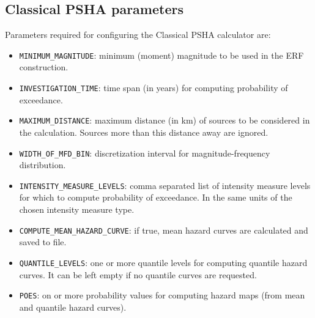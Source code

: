 \subsection{Classical PSHA parameters}
Parameters required for configuring the Classical PSHA calculator are:
\begin{itemize}
\item \Verb+MINIMUM_MAGNITUDE+: minimum (moment) magnitude to be used in the ERF construction.
\item \Verb+INVESTIGATION_TIME+: time span (in years) for computing probability of exceedance.
\item \Verb+MAXIMUM_DISTANCE+: maximum distance (in km) of sources to be considered in the calculation. Sources more than this distance away are ignored.
\item \Verb+WIDTH_OF_MFD_BIN+: discretization interval for  magnitude-frequency distribution.
\item \Verb+INTENSITY_MEASURE_LEVELS+: comma separated list of intensity measure levels for which to compute probability of exceedance. In the same units of the chosen intensity measure type.
\item \Verb+COMPUTE_MEAN_HAZARD_CURVE+: if true, mean hazard curves are calculated and saved to file.
\item \Verb+QUANTILE_LEVELS+: one or more quantile levels for computing quantile hazard curves. It can be left empty if no quantile curves are requested.
\item \Verb+POES+: on or more probability values for computing hazard maps (from mean and quantile hazard curves).
\end{itemize}

